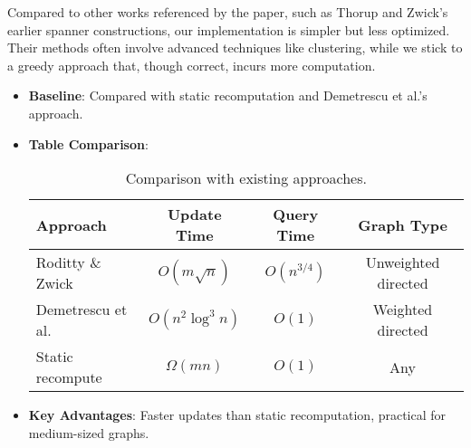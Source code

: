 \documentclass[11pt]{article}
\begin{document}
Compared to other works referenced by the paper, such as Thorup and Zwick’s earlier spanner constructions, our implementation is simpler but less optimized. Their methods often involve advanced techniques like clustering, while we stick to a greedy approach that, though correct, incurs more computation.

\begin{itemize}
    \item \textbf{Baseline}: Compared with static recomputation and Demetrescu et al.’s approach.
    \item \textbf{Table Comparison}:
    \begin{table}[h]
        \centering
        \begin{tabular}{lccc}
            \toprule
            Approach & Update Time & Query Time & Graph Type \\
            \midrule
            Roditty \& Zwick & $O(m \sqrt{n})$ & $O(n^{3/4})$ & Unweighted directed \\
            Demetrescu et al. & $O(n^2 \log^3 n)$ & $O(1)$ & Weighted directed \\
            Static recompute & $\Omega(mn)$ & $O(1)$ & Any \\
            \bottomrule
        \end{tabular}
        \caption{Comparison with existing approaches.}
    \end{table}
    \item \textbf{Key Advantages}: Faster updates than static recomputation, practical for medium-sized graphs.
\end{itemize}
\end{document}
